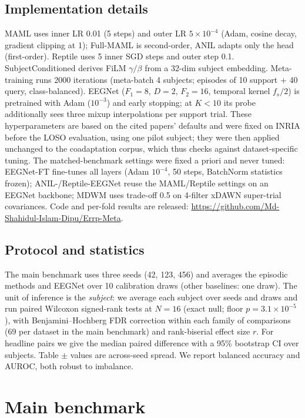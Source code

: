 \documentclass[conference,a4paper]{IEEEtran}
\begin{document}
\subsection{Implementation details}
MAML uses inner LR 0.01 (5 steps) and outer LR $5{\times}10^{-4}$ (Adam, cosine
decay, gradient clipping at 1); Full-MAML is second-order, ANIL adapts only the head
(first-order). Reptile uses 5 inner SGD steps and outer step 0.1.
SubjectConditioned derives FiLM $\gamma/\beta$ from a 32-dim subject embedding.
Meta-training runs 2000 iterations (meta-batch 4 subjects; episodes of 10 support +
40 query, class-balanced). EEGNet ($F_1{=}8$, $D{=}2$, $F_2{=}16$, temporal kernel
$f_s/2$) is pretrained with Adam ($10^{-3}$) and early stopping; at $K{<}10$ its probe
additionally sees three mixup interpolations per support trial. These hyperparameters are based on the cited papers' defaults and were fixed on INRIA before the
LOSO evaluation, using one pilot subject; they were then applied unchanged to the
coadaptation corpus, which thus checks against dataset-specific tuning. The
matched-benchmark settings were fixed a priori and never tuned: EEGNet-FT fine-tunes
all layers (Adam $10^{-4}$, 50 steps, BatchNorm statistics frozen); ANIL-/Reptile-EEGNet
reuse the MAML/Reptile settings on an EEGNet backbone; MDWM uses trade-off 0.5 on
4-filter xDAWN super-trial covariances. Code and per-fold results are released:
\url{https://github.com/Md-Shahidul-Islam-Dipu/Errp-Meta}.

\subsection{Protocol and statistics}
The main benchmark uses three seeds (42, 123, 456) and averages the episodic methods
and EEGNet over 10 calibration draws (other baselines: one draw). The unit of
inference is the \emph{subject}: we average each subject over seeds and draws and run
paired Wilcoxon signed-rank tests at $N{=}16$ (exact null; floor
$p{=}3.1{\times}10^{-5}$), with Benjamini--Hochberg FDR correction within each family
of comparisons (69 per dataset in the main benchmark) and rank-biserial effect size
$r$. For headline pairs we give the median paired difference with a 95\% bootstrap
CI over subjects. Table $\pm$ values are across-seed spread. We report balanced
accuracy and AUROC, both robust to imbalance.

\section{Main benchmark}
\end{document}
